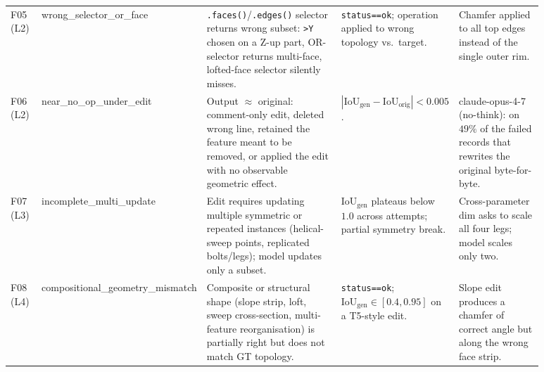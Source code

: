 \begin{table}[t]
\begin{tabular}{@{}p{0.06\linewidth}p{0.18\linewidth}p{0.28\linewidth}p{0.18\linewidth}p{0.18\linewidth}@{}}
F05 \mbox{(L2)} & wrong\_\allowbreak selector\_\allowbreak or\_\allowbreak face & \texttt{.faces()}/\texttt{.edges()} selector returns wrong subset: \texttt{>Y} chosen on a Z-up part, OR-selector returns multi-face, lofted-face selector silently misses. & \texttt{status==ok}; operation applied to wrong topology vs.\ target. & Chamfer applied to all top edges instead of the single outer rim. \\
F06 \mbox{(L2)} & near\_\allowbreak no\_\allowbreak op\_\allowbreak under\_\allowbreak edit & Output $\approx$ original: comment-only edit, deleted wrong line, retained the feature meant to be removed, or applied the edit with no observable geometric effect. & $|\mathrm{IoU}_{\text{gen}} - \mathrm{IoU}_{\text{orig}}| < 0.005$. & claude-opus-4-7 (no-think): on $49\%$ of the failed records that rewrites the original byte-for-byte. \\
F07 \mbox{(L3)} & incomplete\_\allowbreak multi\_\allowbreak update & Edit requires updating multiple symmetric or repeated instances (helical-sweep points, replicated bolts/legs); model updates only a subset. & $\mathrm{IoU}_{\text{gen}}$ plateaus below $1.0$ across attempts; partial symmetry break. & Cross-parameter dim asks to scale all four legs; model scales only two. \\
F08 \mbox{(L4)} & compositional\_\allowbreak geometry\_\allowbreak mismatch & Composite or structural shape (slope strip, loft, sweep cross-section, multi-feature reorganisation) is partially right but does not match GT topology. & \texttt{status==ok}; $\mathrm{IoU}_{\text{gen}} \in [0.4, 0.95]$ on a T5-style edit. & Slope edit produces a chamfer of correct angle but along the wrong face strip. \\
\bottomrule
\end{tabular}
\end{table}
